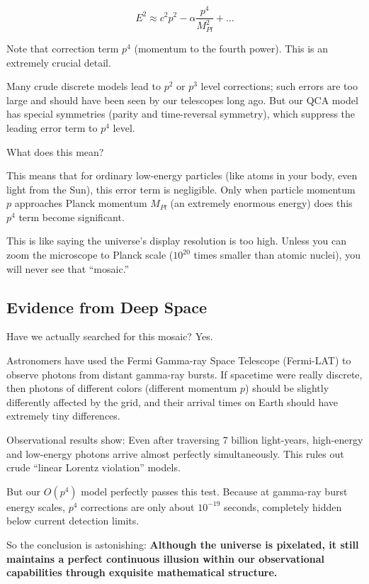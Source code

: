 \documentclass[11pt,a4paper,twoside]{book}
\begin{document}
$$E^2 \approx c^2p^2 - \alpha \frac{p^4}{M_{Pl}^2} + \dots$$

Note that correction term $p^4$ (momentum to the fourth power). This is an extremely crucial detail.

Many crude discrete models lead to $p^2$ or $p^3$ level corrections; such errors are too large and should have been seen by our telescopes long ago. But our QCA model has special symmetries (parity and time-reversal symmetry), which suppress the leading error term to $p^4$ level.

What does this mean?

This means that for ordinary low-energy particles (like atoms in your body, even light from the Sun), this error term is negligible. Only when particle momentum $p$ approaches Planck momentum $M_{Pl}$ (an extremely enormous energy) does this $p^4$ term become significant.

This is like saying the universe's display resolution is too high. Unless you can zoom the microscope to Planck scale ($10^{20}$ times smaller than atomic nuclei), you will never see that ``mosaic.''

\subsection{Evidence from Deep Space}

Have we actually searched for this mosaic? Yes.

Astronomers have used the Fermi Gamma-ray Space Telescope (Fermi-LAT) to observe photons from distant gamma-ray bursts. If spacetime were really discrete, then photons of different colors (different momentum $p$) should be slightly differently affected by the grid, and their arrival times on Earth should have extremely tiny differences.

Observational results show: Even after traversing 7 billion light-years, high-energy and low-energy photons arrive almost perfectly simultaneously. This rules out crude ``linear Lorentz violation'' models.

But our $O(p^4)$ model perfectly passes this test. Because at gamma-ray burst energy scales, $p^4$ corrections are only about $10^{-19}$ seconds, completely hidden below current detection limits.

So the conclusion is astonishing: \textbf{Although the universe is pixelated, it still maintains a perfect continuous illusion within our observational capabilities through exquisite mathematical structure.}
\end{document}
